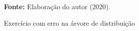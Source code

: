 \begin{figure}[ht!]
\centering

\caption{\textmd{Exercício com erro na árvore de distribuição}}
\label{fig:errodevesp}

\par\medskip\textbf{Fonte:} Elaboração do autor (2020). \par\medskip

\end{figure}

